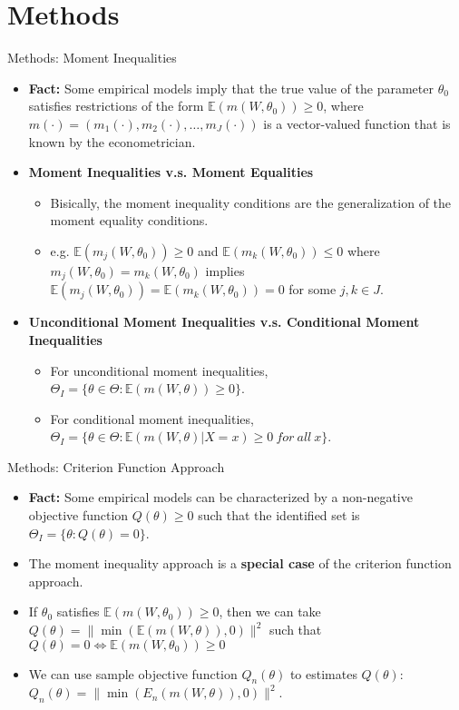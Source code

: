 \documentclass[aspectratio=169]{beamer}  %
\begin{document}
\section{Methods}
\begin{frame}{Methods: Moment Inequalities}
    \begin{itemize}
        \item \textbf{Fact:} Some empirical models imply that the true value of the parameter $\theta_0$ satisfies restrictions of the form $\mathbb{E}(m(W,\theta_0))\geq0$, where $m(·) = (m_1(\cdot), m_2(\cdot), \ldots , m_J (\cdot))$ is a vector-valued function that is known by the econometrician.
        \item \textbf{Moment Inequalities v.s. Moment Equalities}
        \begin{itemize} 
            \item Bisically, the moment inequality conditions are the generalization of the moment equality conditions.
        
            \item e.g. $\mathbb{E}(m_j(W,\theta_0))\geq0$ and $\mathbb{E}(m_k(W,\theta_0)) \le0$ where $m_j(W,\theta_0) = m_k(W,\theta_0)$ implies $\mathbb{E}(m_j(W,\theta_0))=\mathbb{E}(m_k(W,\theta_0))=0$ for some $j,k\in J$.
        \end{itemize}
        \item \textbf{Unconditional Moment Inequalities v.s. Conditional Moment Inequalities}
        \begin{itemize} 
        \item For unconditional moment inequalities, \\ $\Theta_I = \{\theta\in\Theta:\mathbb{E}(m(W,\theta))\geq0\}$.
        \item For conditional moment inequalities, $\Theta_I = \{\theta\in\Theta:\mathbb{E}(m(W,\theta)|X=x)\geq0~for~all~x\}$.
        \end{itemize}
    \end{itemize}
\end{frame}


\begin{frame}{Methods: Criterion Function Approach}
    \begin{itemize}
        \item \textbf{Fact:} Some empirical models can be characterized by a non-negative objective function $Q(\theta)\geq0$ such that the identified set is $\Theta_I = \{\theta: Q(\theta) = 0\}$.
        \item The moment inequality approach is a \textbf{special case} of the criterion function approach.
        \item If $\theta_0$ satisfies $\mathbb{E}(m(W,\theta_0))\geq0$, then we can take $Q(\theta)=\|\min(\mathbb{E}(m(W,\theta)),0)\|^2$ such that $Q(\theta)=0 \iff \mathbb{E}(m(W,\theta_0))\geq0$
        \item We can use sample objective function $Q_n(\theta)$ to estimates $Q(\theta)$: $Q_n(\theta)=\|\min(E_n(m(W,\theta)),0)\|^2$.
    \end{itemize}
\end{frame}
\end{document}
